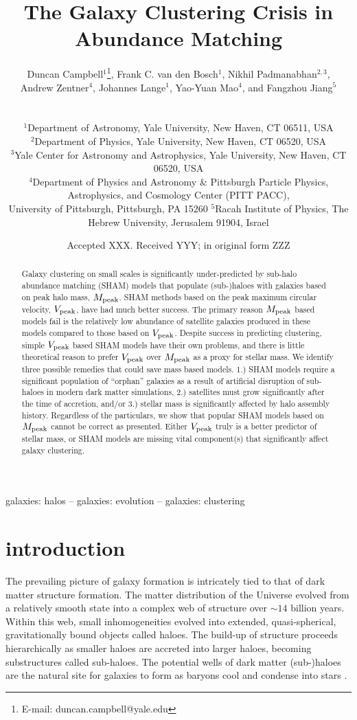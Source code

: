 \documentclass[a4paper,fleqn,usenatbib]{mnras}
\title[The Galaxy Clustering Crisis]{The Galaxy Clustering Crisis in Abundance Matching}
\author[Campbell et al.]
{\parbox[t]{\textwidth}{
Duncan Campbell$^{1}$\thanks{E-mail: duncan.campbell@yale.edu},
Frank C. van den Bosch$^{1}$,
Nikhil Padmanabhan$^{2, 3}$, \\ 
Andrew Zentner$^{4}$,
Johannes Lange$^{1}$,
Yao-Yuan Mao$^{4}$, and
Fangzhou Jiang$^{5}$
} \\
\vspace*{3pt} \\
$^{1}$Department of Astronomy, Yale University, New Haven, CT 06511, USA\\
$^{2}$Department of Physics, Yale University, New Haven, CT 06520, USA \\
$^{3}$Yale Center for Astronomy and Astrophysics, Yale University, New Haven, CT 06520, USA\\
$^{4}$Department of Physics and Astronomy \& Pittsburgh Particle Physics, Astrophysics, and Cosmology Center (PITT PACC),\\ University of Pittsburgh, Pittsburgh, PA 15260
$^{5}$Racah Institute of Physics, The Hebrew University, Jerusalem 91904, Israel
}
\date{Accepted XXX. Received YYY; in original form ZZZ}
\begin{document}
\label{firstpage}
\pagerange{\pageref{firstpage}--\pageref{lastpage}}
\maketitle

\begin{abstract}
Galaxy clustering on small scales is significantly under-predicted by sub-halo abundance matching (SHAM) models that populate (sub-)haloes with galaxies based on peak halo mass, $M_{\rm peak}$.  SHAM methods based on the peak maximum circular velocity, $V_{\rm peak}$, have had much better success.  The primary reason $M_{\rm peak}$ based models fail is the relatively low abundance of satellite galaxies produced in these models compared to those based on $V_{\rm peak}$.  Despite success in predicting clustering, simple $V_{\rm peak}$ based SHAM models have their own problems, and there is little theoretical reason to prefer $V_{\rm peak}$ over $M_{\rm peak}$ as a proxy for stellar mass.  We identify three possible remedies that could save mass based models.  1.) SHAM models require a significant population of ``orphan'' galaxies as a result of artificial disruption of sub-haloes in modern dark matter simulations, 2.) satellites must grow significantly after the time of accretion, and/or 3.) stellar mass is significantly affected by halo assembly history.  Regardless of the particulars, we show that popular SHAM models based on $M_{\rm peak}$ cannot be correct as presented.  Either $V_{\rm peak}$ truly is a better predictor of stellar mass, or SHAM models are missing vital component(s) that significantly affect galaxy clustering.
\end{abstract}

\begin{keywords}
galaxies: halos -- galaxies: evolution -- galaxies: clustering
\end{keywords}

\section{introduction}

The prevailing picture of galaxy formation is intricately tied to that of dark matter structure formation.  The matter distribution of the Universe evolved from a relatively smooth state into a complex web of structure over $\sim 14$ billion years.  Within this web, small inhomogeneities evolved into extended, quasi-spherical, gravitationally bound objects called haloes.  The build-up of structure proceeds hierarchically as smaller haloes are accreted into larger haloes, becoming substructures called sub-haloes.  The potential wells of dark matter (sub-)haloes are the natural site for galaxies to form as baryons cool and condense into stars \citep{Rees:1977gr, White:1978uk, Fall:1980br}.  
\end{document}

